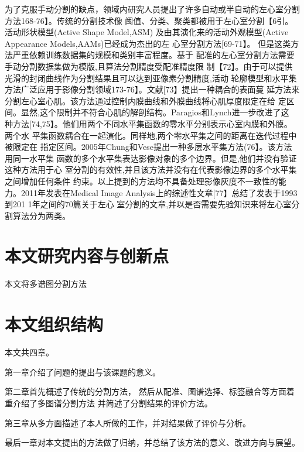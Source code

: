 为了克服手动分割的缺点，领域内研究人员提出了许多自动或半自动的左心室分割方法168-76】。传统的分割技术像
阈值、分类、聚类都被用于左心室分割【6引。活动形状模型(Active
Shape Model,ASM)
及由其演化来的活动外观模型(Active
Appearance
Models,AAMs)已经成为杰出的左
心室分割方法[69-71】。
但是这类方法严重依赖训练数据集的规模和类别丰富程度。基于
配准的左心室分割方法需要手动分割数据集做为模版,且算法分割精度受配准精度限
制【72】。由于可以提供光滑的封闭曲线作为分割结果且可以达到亚像素分割精度,活动
 轮廓模型和水平集方法广泛应用于影像分割领域173-76】。文献[73】提出一种耦合的表面蔓
延方法来分割左心室心肌。该方法通过控制内膜曲线和外膜曲线将心肌厚度限定在给
定区间。显然,这个限制并不符合心肌的解剖结构。Paragios和Lynch进一步改进了这
种方法[74,75】。他们用两个不同水平集函数的零水平分别表示心室内膜和外膜。两个水
平集函数耦合在一起演化。同样地,两个零水平集之间的距离在迭代过程中被限定在
指定区间。2005年Chung和Vese提出一种多层水平集方法(76】。该方法用同一水平集
函数的多个水平集表达影像对象的多个边界。但是,他们并没有验证这种方法用于心
室分割的有效性,并且该方法并没有在代表影像边界的多个水平集之间增加任何条件
约束。以上提到的方法均不具备处理影像灰度不一致性的能力。2011年发表在Medical
Image  Analysis上的综述性文章[77】总结了发表于1993到201 1年之间的70篇关于左心
室分割的文章,并以是否需要先验知识来将左心室分割算法分为两类。



\section{本文研究内容与创新点}
本文将多谱图分割方法


\section{本文组织结构}
本文共四章。

第一章介绍了问题的提出与该课题的意义。

第二章首先概述了传统的分割方法，
然后从配准、图谱选择、标签融合等方面着重介绍了多图谱分割方法
并简述了分割结果的评价方法。

第三章从多方面描述了本人所做的工作，并对结果做了评价与分析。

最后一章对本文提出的方法做了归纳，并总结了该方法的意义、改进方向与展望。


